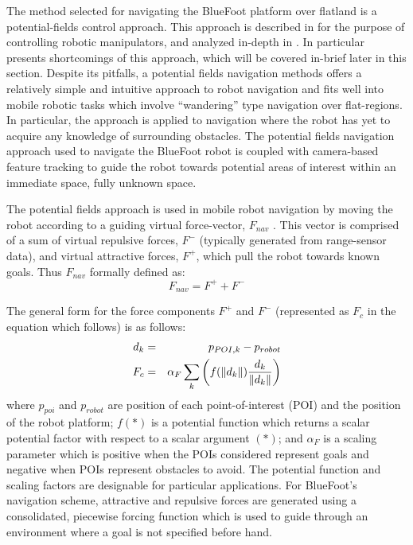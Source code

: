 		The method selected for navigating the BlueFoot platform over flatland is a potential-fields control approach. This approach is described in \cite{Hogan1984} for the purpose of controlling robotic manipulators, and analyzed in-depth in \cite{Koren1991}. In particular \cite{Koren1991} presents shortcomings of this approach, which will be covered in-brief later in this section. Despite its pitfalls, a potential fields navigation methods offers a relatively simple and intuitive approach to robot navigation and fits well into mobile robotic tasks which involve ``wandering'' type navigation over flat-regions. In particular, the approach is applied to navigation where the robot has yet to acquire any knowledge of surrounding obstacles. The potential fields navigation approach used to navigate the BlueFoot robot is coupled with camera-based feature tracking to guide the robot towards potential areas of interest within an immediate space, fully unknown space.

		The potential fields approach is used in mobile robot navigation by moving the robot according to a guiding virtual force-vector, $F_{nav}$ \cite{Koren1991,ArambulaCosio2004}. This vector is comprised of a sum of virtual repulsive forces, $F^{-}$ (typically generated from range-sensor data), and virtual attractive forces, $F^{+}$, which pull the robot towards known goals. Thus $F_{nav}$ formally defined as:
		\begin{equation}
			F_{nav} = F^{+} + F^{-}
			\label{eq::sumofforces}
		\end{equation}

		The general form for the force components $F^{+}$ and $F^{-}$ (represented as $F_{c}$ in the equation which follows) is as follows:
		\begin{eqnarray}
			d_{k} 	&=& p_{POI,k} - p_{robot} \nonumber\\
			F_{c}	&=& \alpha_{F}\sum_{k}\left( f(\left\lVert d_{k}\right\rVert)\frac{d_{k}}{\left\lVert d_{k}\right\rVert} \right)
			\label{eq::sumofforces}
		\end{eqnarray}	
		where $p_{poi}$ and $p_{robot}$ are position of each \Kth point-of-interest (POI) and the position of the robot platform; $f(*)$ is a potential function which returns a scalar potential factor with respect to a scalar argument $(*)$; and $\alpha_{F}$ is a scaling parameter which is positive when the POIs considered represent goals and negative when POIs represent obstacles to avoid. The potential function and scaling factors are designable for particular applications. For BlueFoot's navigation scheme, attractive and repulsive forces are generated using a consolidated, piecewise forcing function which is used to guide through an environment where a goal is not specified before hand. 

